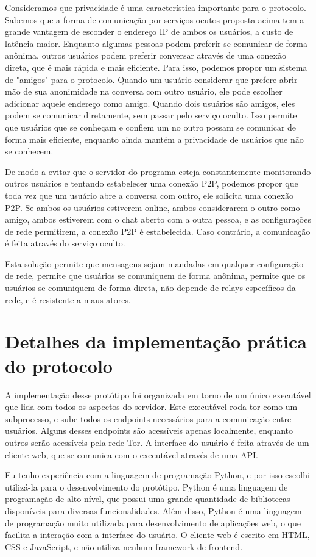 Consideramos que privacidade é uma característica importante para o protocolo. Sabemos que a forma de comunicação por serviços ocutos proposta acima tem a grande vantagem de esconder o endereço IP de ambos os usuários, a custo de latência maior. Enquanto algumas pessoas podem preferir se comunicar de forma anônima, outros usuários podem preferir conversar através de uma conexão direta, que é mais rápida e mais eficiente. Para isso, podemos propor um sistema de "amigos" para o protocolo. Quando um usuário considerar que prefere abrir mão de sua anonimidade na conversa com outro usuário, ele pode escolher adicionar aquele endereço como amigo. Quando dois usuários são amigos, eles podem se comunicar diretamente, sem passar pelo serviço oculto. Isso permite que usuários que se conheçam e confiem um no outro possam se comunicar de forma mais eficiente, enquanto ainda mantém a privacidade de usuários que não se conhecem.

De modo a evitar que o servidor do programa esteja constantemente monitorando outros usuários e tentando estabelecer uma conexão P2P, podemos propor que toda vez que um usuário abre a conversa com outro, ele solicita uma conexão P2P. Se ambos os usuários estiverem online, ambos considerarem o outro como amigo, ambos estiverem com o chat aberto com a outra pessoa, e as configurações de rede permitirem, a conexão P2P é estabelecida. Caso contrário, a comunicação é feita através do serviço oculto.

Esta solução permite que mensagens sejam mandadas em qualquer configuração de rede, permite que usuários se comuniquem de forma anônima, permite que os usuários se comuniquem de forma direta, não depende de relays específicos da rede, e é resistente a maus atores.

\section{Detalhes da implementação prática do protocolo}

A implementação desse protótipo foi organizada em torno de um único executável que lida com todos os aspectos do servidor. Este executável roda tor como um subprocesso, e sube todos os endpoints necessários para a comunicação entre usuários. Alguns desses endpoints são acessíveis apenas localmente, enquanto outros serão acessíveis pela rede Tor. A interface do usuário é feita através de um cliente web, que se comunica com o executável através de uma API.

Eu tenho experiência com a linguagem de programação Python, e por isso escolhi utilizá-la para o desenvolvimento do protótipo. Python é uma linguagem de programação de alto nível, que possui uma grande quantidade de bibliotecas disponíveis para diversas funcionalidades. Além disso, Python é uma linguagem de programação muito utilizada para desenvolvimento de aplicações web, o que facilita a interação com a interface do usuário. O cliente web é escrito em HTML, CSS e JavaScript, e não utiliza nenhum framework de frontend.


